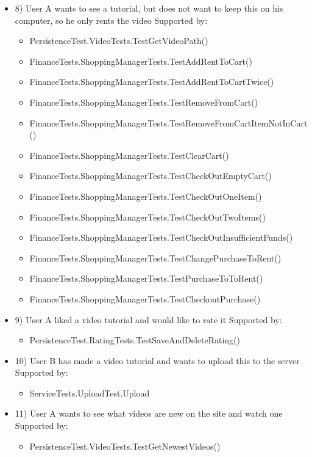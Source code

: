 \begin{itemize}
\item 8)
User A wants to see a tutorial, but does not want to keep this on his computer, so he only rents the video
\newline Supported by:
\begin{itemize}
\item PersistenceTest.VideoTests.TestGetVideoPath()
\item FinanceTests.ShoppingManagerTests.TestAddRentToCart()
\item FinanceTests.ShoppingManagerTests.TestAddRentToCartTwice()
\item FinanceTests.ShoppingManagerTests.TestRemoveFromCart()
\item FinanceTests.ShoppingManagerTests.TestRemoveFromCartItemNotInCart()
\item FinanceTests.ShoppingManagerTests.TestClearCart()
\item FinanceTests.ShoppingManagerTests.TestCheckOutEmptyCart()
\item FinanceTests.ShoppingManagerTests.TestCheckOutOneItem()
\item FinanceTests.ShoppingManagerTests.TestCheckOutTwoItems()
\item FinanceTests.ShoppingManagerTests.TestCheckOutInsufficientFunds()
\item FinanceTests.ShoppingManagerTests.TestChangePurchaseToRent()
\item FinanceTests.ShoppingManagerTests.TestPurchaseToToRent()
\item FinanceTests.ShoppingManagerTests.TestCheckoutPurchase()
\end{itemize}

\item 9)
User A liked a video tutorial and would like to rate it
\newline Supported by:
\begin{itemize}
\item PersistenceTest.RatingTests.TestSaveAndDeleteRating()
\end{itemize}

\item 10)
User B has made a video tutorial and wants to upload this to the server
\newline Supported by:
\begin{itemize}
\item ServiceTests.UploadTest.Upload
\end{itemize} 

\item 11)
User A wants to see what videos are new on the site and watch one
\newline Supported by:
\begin{itemize}
\item PersistenceTest.VideoTests.TestGetNewestVideos()
\end{itemize}


\end{itemize}
